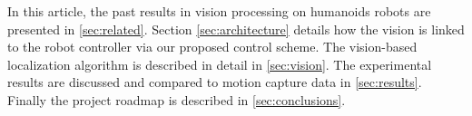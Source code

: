 In this article, the past results in vision processing on humanoids
robots are presented in \ref{sec:related}. Section
\ref{sec:architecture} details how the vision is linked to the robot
controller via our proposed control scheme. The vision-based
localization algorithm is described in detail in \ref{sec:vision}. The
experimental results are discussed and compared to motion capture data
in \ref{sec:results}. Finally the project roadmap is described in
\ref{sec:conclusions}.


